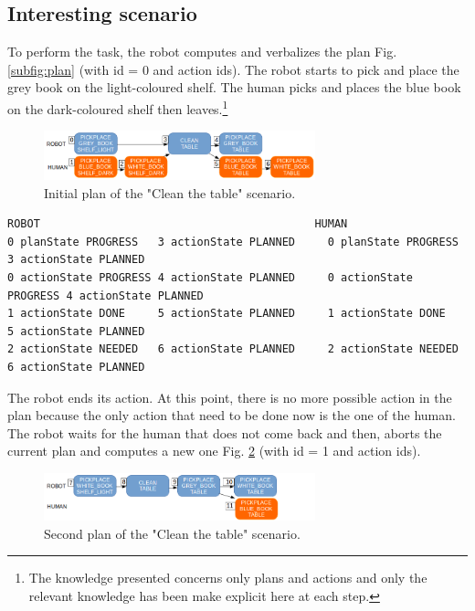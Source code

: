 \documentclass[english,a4paper,11pt,twoside]{StyleThese}
\begin{document}
\subsection{Interesting scenario}


To perform the task, the robot computes and verbalizes the plan Fig. \ref{subfig:plan} (with id = 0 and action ids). The robot starts to pick and place the grey book on the light-coloured shelf. The human picks and places the blue book on the dark-coloured shelf then leaves.\footnote{The knowledge presented concerns only plans and actions and only the relevant knowledge has been make explicit here at each step.}


\begin{figure}[!h]
	\centering
    \includegraphics[width=0.7\textwidth]{figs/Chapter3/InitCleanPlan.png}
    \caption{Initial plan of the "Clean the table" scenario.}
    \label{fig:initPlanClean}
\end{figure}

\begin{scriptsize}
\begin{Verbatim}[commandchars=\\\{\}]      
                      ROBOT                                          HUMAN                          
0 planState PROGRESS   3 actionState PLANNED     0 planState PROGRESS   3 actionState PLANNED
0 actionState PROGRESS 4 actionState PLANNED     0 actionState PROGRESS 4 actionState PLANNED
1 actionState DONE     5 actionState PLANNED     1 actionState DONE     5 actionState PLANNED
2 actionState NEEDED   6 actionState PLANNED     2 actionState NEEDED   6 actionState PLANNED  
\end{Verbatim}
\end{scriptsize}


The robot ends its action. At this point, there is no more possible action in the plan because the only action that need to be done now is the one of the human. The robot waits for the human that does not come back and then, aborts the current plan and computes a new one Fig. \ref{fig:newplan} (with id = 1 and action ids).


\begin{figure}[!h]
	\centering
    \includegraphics[width=0.7\textwidth]{figs/Chapter3/SecondCleanPlan.png}
    \caption{Second plan of the "Clean the table" scenario.}
    \label{fig:newplan}
\end{figure}
\end{document}
